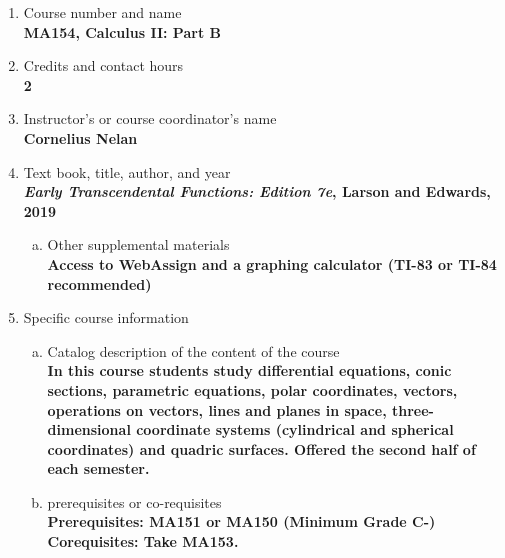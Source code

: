 \label{MA154}  %
\begin{enumerate}[1.]
\item Course number and name\\
  {\bfseries
    MA154, Calculus II: Part B
  }
  
\item Credits and contact hours\\
  {\bfseries
    2  %
  }

\item Instructor's or course coordinator's name\\
  {\bfseries
    Cornelius Nelan    
  }

\item Text book, title, author, and year\\
  {\bfseries
    {\em Early Transcendental Functions: Edition 7e}, Larson and Edwards, 2019
  }
\begin{enumerate}[a.]
\item Other supplemental materials\\
  {\bfseries
    Access to WebAssign and a graphing calculator (TI-83 or TI-84 recommended)
  }
\end{enumerate}

\item Specific course information
\begin{enumerate}[a.]  
\item Catalog description of the content of the course\\
  {\bfseries
In this course students study differential equations, conic sections, parametric equations, polar coordinates, vectors, operations on vectors, lines and planes in space, three-dimensional coordinate systems (cylindrical and spherical coordinates) and quadric surfaces. Offered the second half of each semester.
}

\item prerequisites or co-requisites\\
  {\bfseries
    Prerequisites: MA151 or MA150 (Minimum Grade C-)\\ %
    Corequisites: Take MA153.
  }


\end{enumerate}
\end{enumerate}
